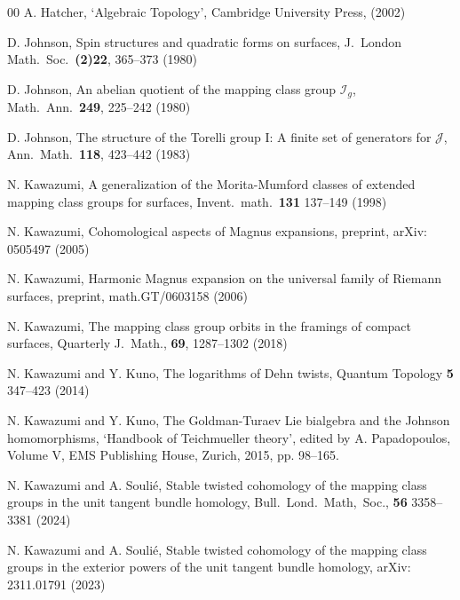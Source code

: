 \documentclass[a4paper,12pt, twoside]{amsart}
\theoremstyle{definition}
\theoremstyle{remark}
\numberwithin{equation}{section}
\begin{document}
\begin{thebibliography}{00}
A. Hatcher,
`Algebraic Topology', Cambridge University Press, (2002)

D. Johnson,
Spin structures and quadratic forms on surfaces,
J.\ London Math.\ Soc.\  \textbf{(2)22}, 365--373 (1980) 

D. Johnson,
An abelian quotient of the mapping class group $\mathcal{I}_g$,
Math.\ Ann.\  \textbf{249}, 225--242 (1980) 

D. Johnson,
The structure of the Torelli group I: A finite set of generators for $\mathcal{J}$,
Ann.\ Math.\ \textbf{118}, 423--442 (1983)

N. Kawazumi, 
A generalization of the Morita-Mumford classes of extended mapping class groups for surfaces, 
Invent.\, math.\, \textbf{131} 137--149 (1998)

N. Kawazumi, 
Cohomological aspects of Magnus expansions,
preprint, arXiv: 0505497 (2005) 

N. Kawazumi,
Harmonic Magnus expansion on the universal family of Riemann surfaces,
preprint, math.GT/0603158 (2006)



N. Kawazumi, 
The mapping class group orbits in the framings of compact surfaces,
Quarterly J.\ Math., \textbf{69}, 1287--1302 (2018)



N. Kawazumi and Y. Kuno,
The logarithms of Dehn twists, 
Quantum Topology \textbf{5} 347--423 (2014)

N. Kawazumi and Y. Kuno,
The Goldman-Turaev Lie bialgebra and the Johnson homomorphisms, `Handbook of Teichmueller theory', 
edited by A. Papadopoulos, Volume V, EMS Publishing House, Zurich, 2015, pp. 98--165.

N. Kawazumi and A. Souli\'e, 
Stable twisted cohomology of the mapping class groups in the unit tangent bundle homology,
Bull.\, Lond.\, Math,\, Soc., \textbf{56} 3358--3381 (2024)

N. Kawazumi and A. Souli\'e, 
Stable twisted cohomology of the mapping class groups in the exterior powers of the unit tangent bundle homology, arXiv: 2311.01791 (2023)


\end{thebibliography}
\end{document}

